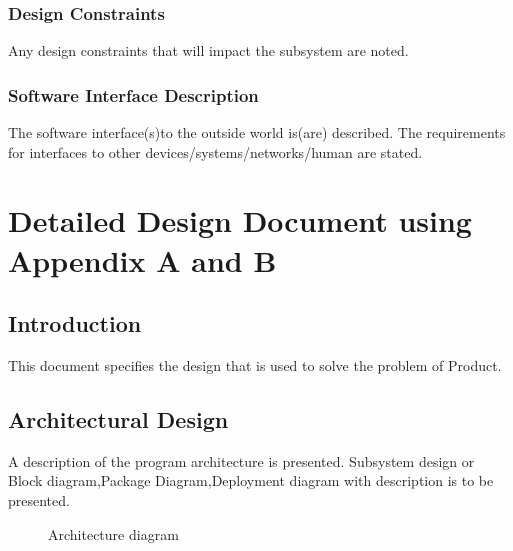 \documentclass[oneside,a4paper,12pt]{report}
\begin{document}
 \subsection{Design Constraints}	
Any design constraints that will impact the subsystem are noted.
 \subsection{Software Interface Description}	 
The software interface(s)to the outside world is(are) described.
The requirements for interfaces to other devices/systems/networks/human are stated.



\chapter{Detailed Design Document using Appendix A and B}
 \section{Introduction}  
This document specifies the design that is used to solve the problem of Product.  
\section{Architectural Design}  
	A description of the program architecture is presented. Subsystem design or Block diagram,Package Diagram,Deployment diagram with description is to be presented.

 
  \begin{center}
	\begin{figure}[!htbp]
		\centering
	  \caption{Architecture diagram}
	  \label{fig:arch-dig}
	\end{figure}
\end{center} 
\end{document}
